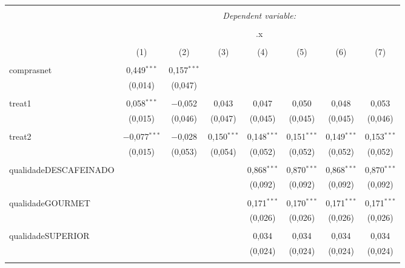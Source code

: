 
\begin{table}[!htbp] \centering 
  \caption{} 
  \label{} 
\begin{tabular}{@{\extracolsep{5pt}}lccccccc} 
\\[-1.8ex]\hline 
\hline \\[-1.8ex] 
 & \multicolumn{7}{c}{\textit{Dependent variable:}} \\ 
\cline{2-8} 
\\[-1.8ex] & \multicolumn{7}{c}{.x} \\ 
\\[-1.8ex] & (1) & (2) & (3) & (4) & (5) & (6) & (7)\\ 
\hline \\[-1.8ex] 
 comprasnet & 0,449$^{***}$ & 0,157$^{***}$ &  &  &  &  &  \\ 
  & (0,014) & (0,047) &  &  &  &  &  \\ 
  & & & & & & & \\ 
 treat1 & 0,058$^{***}$ & $-$0,052 & 0,043 & 0,047 & 0,050 & 0,048 & 0,053 \\ 
  & (0,015) & (0,046) & (0,047) & (0,045) & (0,045) & (0,045) & (0,046) \\ 
  & & & & & & & \\ 
 treat2 & $-$0,077$^{***}$ & $-$0,028 & 0,150$^{***}$ & 0,148$^{***}$ & 0,151$^{***}$ & 0,149$^{***}$ & 0,153$^{***}$ \\ 
  & (0,015) & (0,053) & (0,054) & (0,052) & (0,052) & (0,052) & (0,052) \\ 
  & & & & & & & \\ 
 qualidadeDESCAFEINADO &  &  &  & 0,868$^{***}$ & 0,870$^{***}$ & 0,868$^{***}$ & 0,870$^{***}$ \\ 
  &  &  &  & (0,092) & (0,092) & (0,092) & (0,092) \\ 
  & & & & & & & \\ 
 qualidadeGOURMET &  &  &  & 0,171$^{***}$ & 0,170$^{***}$ & 0,171$^{***}$ & 0,171$^{***}$ \\ 
  &  &  &  & (0,026) & (0,026) & (0,026) & (0,026) \\ 
  & & & & & & & \\ 
 qualidadeSUPERIOR &  &  &  & 0,034 & 0,034 & 0,034 & 0,034 \\ 
  &  &  &  & (0,024) & (0,024) & (0,024) & (0,024) \\ 
  & & & & & & & \\ 

\end{tabular}
\end{table}
